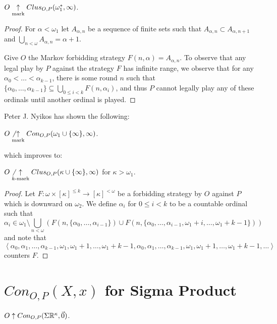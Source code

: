 \begin{thm}
$O\underset{\text{mark}}{\uparrow} Clus_{O,P}(\omega_1^*,\infty)$.
\end{thm}

\begin{proof}
For $\alpha<\omega_1$ let $A_{\alpha,n}$ be a sequence of finite sets such that $A_{\alpha,n}\subset A_{\alpha,n+1}$ and $\bigcup_{n<\omega}A_{\alpha,n}=\alpha+1$.

Give $O$ the Markov forbidding strategy $F(n,\alpha)=A_{\alpha,n}$. To observe that any legal play by $P$ against the strategy $F$ has infinite range, we observe that for any $\alpha_0<\dots<\alpha_{k-1}$, there is some round $n$ such that $\{\alpha_0,\dots,\alpha_{k-1}\}\subseteq \bigcup_{0\leq i < k}F(n,\alpha_i)$, and thus $P$ cannot legally play any of these ordinals until another ordinal is played.
\end{proof}

Peter J. Nyikos has shown the following:

\begin{thm}
$O\not\underset{\text{mark}}{\uparrow} Con_{O,P}(\omega_1\cup\{\infty\},\infty)$.
\end{thm}

which improves to:

\begin{thm}
$O\not\underset{k\text{-mark}}{\uparrow}Clus_{O,P}(\kappa\cup\{\infty\},\infty)$ for $\kappa>\omega_1$.
\end{thm}

\begin{proof}
Let $F:\omega \times [\kappa]^{\leq k} \to [\kappa]^{<\omega}$ be a forbidding strategy by $O$ against $P$ which is downward on $\omega_2$. We define $\alpha_i$ for $0\leq i < k$ to be a countable ordinal such that \[ \alpha_i \in \omega_1 \setminus\bigcup_{n<\omega}\left(F(n,\{\alpha_0,\dots,\alpha_{i-1}\}) \cup F(n,\{\alpha_0,\dots,\alpha_{i-1},\omega_1+i,\dots,\omega_1+k-1\})\right)\] and note that \[\left<\alpha_0,\alpha_1,\dots,\alpha_{k-1},\omega_1,\omega_1+1,\dots,\omega_1+k-1,\alpha_0,\alpha_1,\dots,\alpha_{k-1},\omega_1,\omega_1+1,\dots,\omega_1+k-1,\dots\right>\] counters $F$.
\end{proof}

\section{$Con_{O,P}(X,x)$ for Sigma Product}

\begin{prop}
$O\uparrow Con_{O,P}(\Sigma\mathbb{R}^{\kappa},\vec{0})$.
\end{prop}

